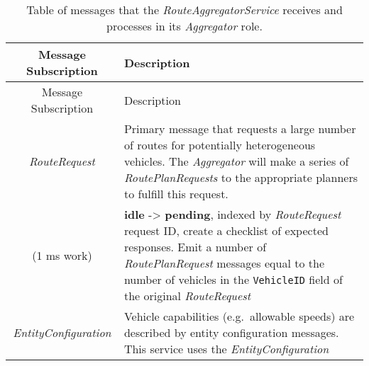 \begin{longtable}[]{@{}cl@{}}
\caption{Table of messages that the \emph{RouteAggregatorService}
receives and processes in its \emph{Aggregator} role.}\tabularnewline
\toprule
\begin{minipage}[b]{0.40\columnwidth}\centering\strut
Message Subscription\strut
\end{minipage} & \begin{minipage}[b]{0.55\columnwidth}\raggedright\strut
Description\strut
\end{minipage}\tabularnewline
\midrule
\endfirsthead
\toprule
\begin{minipage}[b]{0.40\columnwidth}\centering\strut
Message Subscription\strut
\end{minipage} & \begin{minipage}[b]{0.55\columnwidth}\raggedright\strut
Description\strut
\end{minipage}\tabularnewline
\midrule
\endhead
\begin{minipage}[t]{0.40\columnwidth}\centering\strut
\emph{RouteRequest}\strut
\end{minipage} & \begin{minipage}[t]{0.55\columnwidth}\raggedright\strut
Primary message that requests a large number of routes for potentially
heterogeneous vehicles. The \emph{Aggregator} will make a series of
\emph{RoutePlanRequests} to the appropriate planners to fulfill this
request.\strut
\end{minipage}\tabularnewline
\begin{minipage}[t]{0.40\columnwidth}\centering\strut
(1 ms work)\strut
\end{minipage} & \begin{minipage}[t]{0.55\columnwidth}\raggedright\strut
\textbf{idle} -\textgreater{} \textbf{pending}, indexed by
\emph{RouteRequest} request ID, create a checklist of expected
responses. Emit a number of \emph{RoutePlanRequest} messages equal to
the number of vehicles in the \texttt{VehicleID} field of the original
\emph{RouteRequest}\strut
\end{minipage}\tabularnewline
\begin{minipage}[t]{0.40\columnwidth}\centering\strut
\emph{EntityConfiguration}\strut
\end{minipage} & \begin{minipage}[t]{0.55\columnwidth}\raggedright\strut
Vehicle capabilities (e.g.~allowable speeds) are described by entity
configuration messages. This service uses the \emph{EntityConfiguration}

\end{minipage}
\end{longtable}
